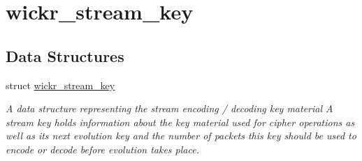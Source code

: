 \hypertarget{group__wickr__stream__key}{}\section{wickr\+\_\+stream\+\_\+key}
\label{group__wickr__stream__key}
\subsection*{Data Structures}
\begin{DoxyCompactItemize}
\item 
struct \mbox{\hyperlink{structwickr__stream__key}{wickr\+\_\+stream\+\_\+key}}
\begin{DoxyCompactList}\small\item\em A data structure representing the stream encoding / decoding key material A stream key holds information about the key material used for cipher operations as well as it\textquotesingle{}s next evolution key and the number of packets this key should be used to encode or decode before evolution takes place. \end{DoxyCompactList}\end{DoxyCompactItemize}

